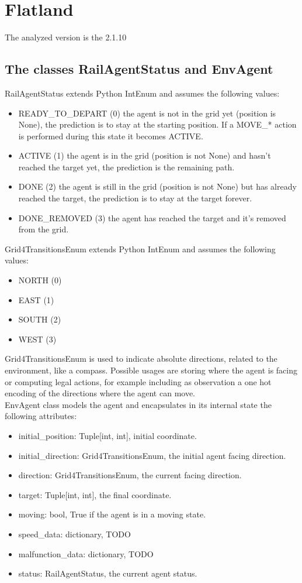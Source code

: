 \documentclass[12pt, a4paper, hidelinks]{article}
\begin{document}
\section{Flatland}

The analyzed version is the 2.1.10

\subsection{The classes RailAgentStatus and EnvAgent}

RailAgentStatus extends Python IntEnum and assumes the following values:
\begin{itemize}
	\item READY\_TO\_DEPART (0) the agent is not in the grid yet (position is None), the prediction is to stay at the starting position. If a MOVE\_* action is performed during this state it becomes ACTIVE\@.
	\item ACTIVE (1) the agent is in the grid (position is not None) and hasn't reached the target yet, the prediction is the remaining path.
	\item DONE (2) the agent is still in the grid (position is not None) but has already reached the target, the prediction is to stay at the target forever.
	\item DONE\_REMOVED (3) the agent has reached the target and it's removed from the grid.
\end{itemize}

Grid4TransitionsEnum extends Python IntEnum and assumes the following values:
\begin{itemize}
	\item NORTH (0)
	\item EAST (1)
	\item SOUTH (2)
	\item WEST (3)
\end{itemize}
Grid4TransitionsEnum is used to indicate absolute directions, related to the environment, like a compass.
Possible usages are storing where the agent is facing or computing legal actions, for example including as observation a one hot encoding of the directions where the agent can move.
\\
EnvAgent class models the agent and encapsulates in its internal state the following attributes:
\begin{itemize}
	\item initial\_position: Tuple[int, int], initial coordinate.
	\item initial\_direction: Grid4TransitionsEnum, the initial agent facing direction.
	\item direction: Grid4TransitionsEnum, the current facing direction.
	\item target: Tuple[int, int], the final coordinate.
	\item moving: bool, True if the agent is in a moving state.
	\item speed\_data: dictionary, TODO
	\item malfunction\_data: dictionary, TODO
	\item status: RailAgentStatus, the current agent status.
\end{itemize}
\end{document}
